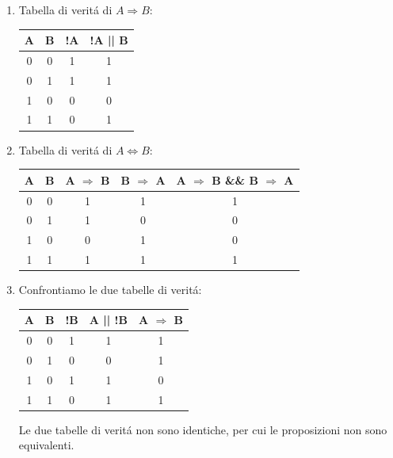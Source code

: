 \begin{Answer}[ref={ex:implicazione}]
\begin{enumerate}
	\item Tabella di verit\'a di $A \Rightarrow B$:
	\begin{table}[H]
		\centering
			\begin{tabular}{|c | c | c | c|}\hline
				A & B & !A & !A || B \\ \hline
				0 & 0 & 1  & 1       \\ \hline
				0 & 1 & 1  & 1       \\ \hline
				1 & 0 & 0  & 0       \\ \hline
				1 & 1 & 0  & 1      \\ \hline
			\end{tabular}
	\end{table}
	\item Tabella di verit\'a di $A \Leftrightarrow B$:
	\begin{table}[H]
		\centering
			\begin{tabular}{|c | c | c | c | c|}\hline
				A & B & A $\Rightarrow$ B & B $\Rightarrow$ A & A $\Rightarrow$ B \&\& B $\Rightarrow$ A \\ \hline
				0 & 0 & 1  & 1   & 1    \\ \hline
				0 & 1 & 1  & 0  & 0     \\ \hline
				1 & 0 & 0  & 1  & 0     \\ \hline
				1 & 1 & 1 & 1     & 1   \\ \hline
			\end{tabular}
	\end{table}
	\item Confrontiamo le due tabelle di verit\'a:
	\begin{table}[H]
		\centering
			\begin{tabular}{|c | c | c | c | c|}\hline
				A & B & !B & A || !B & A $\Rightarrow$ B \\ \hline
				0 & 0 & 1  & 1  & 1     \\ \hline
				0 & 1 & 0 & 0  & 1   \\ \hline
				1 & 0 & 1  & 1   & 0    \\ \hline
				1 & 1 & 0  & 1     & 1 \\ \hline
			\end{tabular}
	\end{table}
	Le due tabelle di verit\'a non sono identiche, per cui le proposizioni non sono equivalenti.
	
\end{enumerate}

\end{Answer}